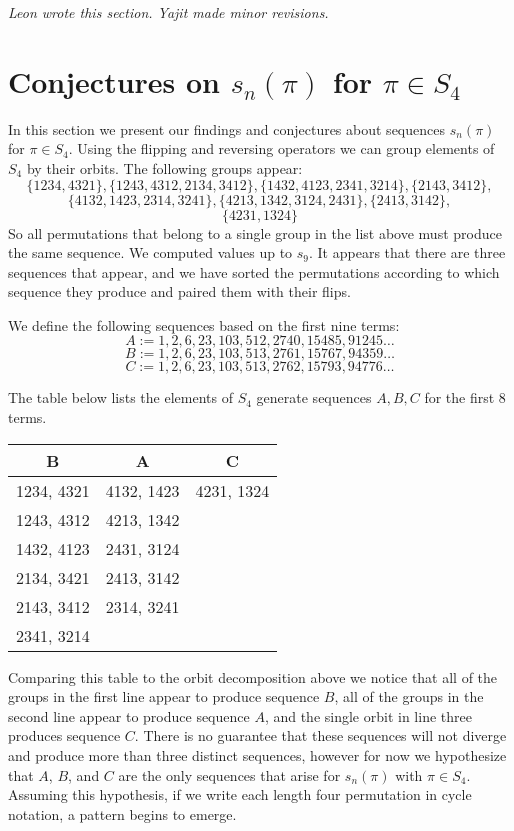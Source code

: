 \documentclass[11pt,letterpaper,twoside,english]{article}
\theoremstyle{theorem}
\theoremstyle{remark}
\begin{document}
\emph{Leon wrote this section. Yajit made minor revisions.}

\section{Conjectures on $s_n(\pi)$ for $\pi\in S_4$}
\label{S4}


In this section we present our findings and conjectures about sequences $s_n(\pi)$ for $\pi\in S_4$. Using the flipping and reversing operators we can group elements of $S_4$ by their orbits. The following groups appear: 
$$
\{1234,4321\},
\{1243,4312,2134,3412\},
\{1432,4123,2341,3214\},
\{2143,3412\},
$$
$$
\{4132,1423,2314,3241\},
\{4213,1342,3124,2431\},
\{2413,3142\},
$$
$$
\{4231,1324\}
$$
So all permutations that belong to a single group in the list above must produce the same sequence. 
We computed values up to $s_{9}$. It appears that there are three sequences that appear, and we have sorted the permutations according to which sequence they produce and paired them with their flips.  



We define the following sequences based on the first nine terms:
$$
A:=1,2,6,23,103,512,2740,15485,91245\ldots
$$
$$
B:=1,2,6,23,103,513,2761,15767,94359\ldots
$$
$$
C:=1,2,6,23,103,513,2762,15793,94776\ldots
$$

The table below lists the elements of $S_4$ generate sequences $A,B,C$ for the first 8 terms.

\begin{center}
\begin{tabular}{|c|c|c|}
B &A&C\\
\hline
1234, 4321&4132, 1423&4231, 1324\\
1243, 4312&4213, 1342&\\
1432, 4123&2431, 3124&\\
2134, 3421&2413, 3142&\\
2143, 3412&2314, 3241&\\
2341, 3214&&\\
\end{tabular}
\end{center}

Comparing this table to the orbit decomposition above we notice that all of the groups in the first line appear to produce sequence $B$, all of the groups in the second line appear to produce sequence $A$, and the single orbit in line three produces sequence $C$. There is no guarantee that these sequences will not diverge and produce more than three distinct sequences, however for now we hypothesize that $A$, $B$, and $C$ are the only sequences that arise for $s_n(\pi)$ with $\pi\in S_4$. Assuming this hypothesis, if we write each length four permutation in cycle notation, a pattern begins to emerge. 
\end{document}
